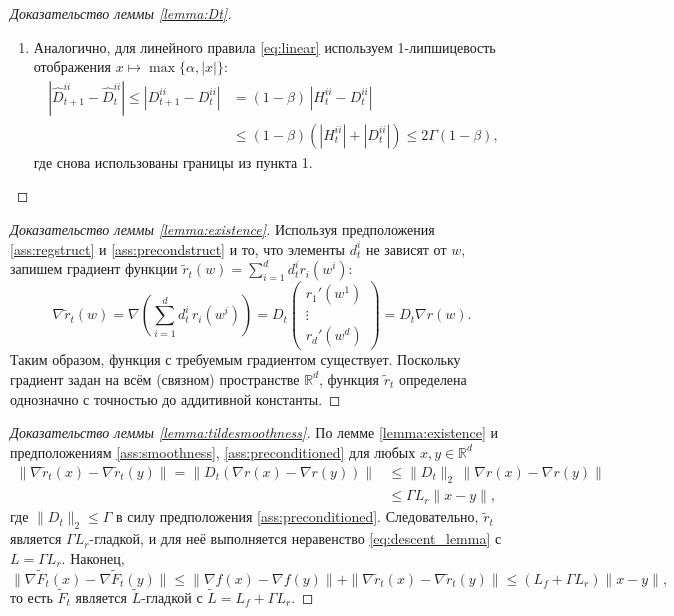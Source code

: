 \begin{proof}[Доказательство леммы \ref{lemma:Dt}]
\begin{enumerate}
    \item Аналогично, для линейного правила \eqref{eq:linear} используем 1-липшицевость отображения $x \mapsto \max\{\alpha, |x|\}$:
    \begin{equation*}
    \begin{split}
    |\hat{D}_{t+1}^{ii} - \hat{D}_t^{ii}| \le |D_{t+1}^{ii} - D_t^{ii}| &= (1 - \beta)\,|H_t^{ii} - D_t^{ii}| \\
    &\le (1-\beta)\left(|H_t^{ii}| + |D_t^{ii}|\right) \le 2\Gamma (1 - \beta),
    \end{split}
    \end{equation*}
    где снова использованы границы из пункта 1.
\end{enumerate}
\end{proof}

\begin{proof}[Доказательство леммы \ref{lemma:existence}]
Используя предположения \ref{ass:regstruct} и \ref{ass:precondstruct} и то, что элементы $d_t^i$ не зависят от $w$, запишем градиент функции $\widetilde{r}_t(w) = \sum_{i=1}^d d_t^i r_i(w^i)$:
\begin{equation*}
\nabla \widetilde{r}_t(w) = \nabla \left( \sum_{i=1}^d d_t^i \, r_i(w^i) \right) = D_t \begin{pmatrix}
  r_1'(w^1) \\
  \vdots  \\
  r_d'(w^d)
\end{pmatrix} = D_t \nabla r(w).
\end{equation*}
Таким образом, функция с требуемым градиентом существует. Поскольку градиент задан на всём (связном) пространстве $\mathbb{R}^d$, функция $\widetilde{r}_t$ определена однозначно с точностью до аддитивной константы.
\end{proof}

\begin{proof}[Доказательство леммы \ref{lemma:tildesmoothness}]
По лемме \ref{lemma:existence} и предположениям \ref{ass:smoothness}, \ref{ass:preconditioned} для любых $x, y \in \mathbb{R}^d$
\begin{equation*}
\begin{split}
    \| \nabla \widetilde{r}_t(x) - \nabla \widetilde{r}_t(y) \| =
    \|D_t \left( \nabla r(x) - \nabla r(y) \right)\| &\le  \|D_t\|_2 \, \|\nabla r(x) - \nabla r(y)\| \\
    &\le \Gamma L_r \|x - y\|,
\end{split}
\end{equation*}
где $\|D_t\|_2 \le \Gamma$ в силу предположения \ref{ass:preconditioned}. Следовательно, $\widetilde{r}_t$ является $\Gamma L_r$-гладкой, и для неё выполняется неравенство \eqref{eq:descent_lemma} с $L = \Gamma L_r$. Наконец,
\begin{equation*}
    \|\nabla \widetilde{F}_t(x) - \nabla \widetilde{F}_t(y)\| \le \|\nabla f(x) - \nabla f(y)\| + \|\nabla \widetilde{r}_t(x) - \nabla \widetilde{r}_t(y)\| \le (L_f + \Gamma L_r) \|x-y\|,
\end{equation*}
то есть $\widetilde{F}_t$ является $\widetilde{L}$-гладкой с $\widetilde{L} = L_f + \Gamma L_r$.
\end{proof}

